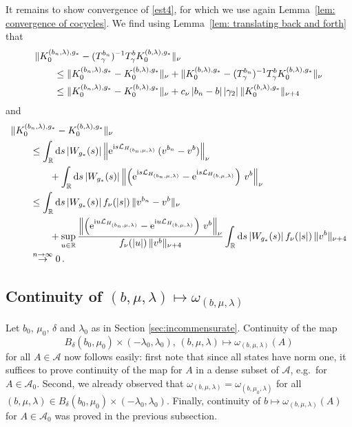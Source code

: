\documentclass[a4paper]{article}
\newcommand{\e}{\mathrm{e}}
\renewcommand{\i}{\mathrm{i}}
\newcommand{\g}{\gamma}
\newcommand{\w}{\omega}
\newcommand{\mA}{\mathcal{A}}
\newcommand{\R}{\mathbb{R}}
\newcommand{\mL}{\mathcal{L}}
\DeclarePairedDelimiter\abs{\lvert}{\rvert}
\theoremstyle{plain}
\theoremstyle{definition}
\theoremstyle{remark}
\renewcommand{\(}{\left(}
\renewcommand{\)}{\right)}
\begin{document}
It remains to show convergence of \eqref{est4}, for which we use again Lemma~\ref{lem: convergence of cocycles}. 
We find using Lemma~\ref{lem: translating back and forth} that
\begin{align*}
    \hspace{2em}&\hspace{-2em}
    \lVert    K^{(b_n,\lambda),g_*}_0 - (T_\g^{b_n})^{-1}T^{b}_\gamma K^{(b,\lambda),g_*}_0  \rVert_\nu 
    \\
    &\leq
    \lVert    K^{(b_n,\lambda),g_*}_0 - K^{(b,\lambda),g_*}_0 \rVert_\nu + \lVert    K^{(b,\lambda),g_*}_0 - (T_\g^{b_n})^{-1}T^{b}_\gamma K^{(b,\lambda),g_*}_0  \rVert_\nu
    \\
    &\leq
    \lVert    K^{(b_n,\lambda),g_*}_0 - K^{(b,\lambda),g_*}_0 \rVert_\nu + c_\nu \, |b_n-b|\,|\gamma_2|\, \| K^{(b,\lambda) ,g_*}_0\|_{\nu+4}\,    
\end{align*}
and
\begin{align*}
    \hspace{2em}&\hspace{-2em}
    \lVert    K^{(b_n,\lambda),g_*}_0 - K^{(b,\lambda),g_*}_0 \rVert_\nu
    \\
    &\leq
    \int_{\R}\mathrm{d}s \,\abs{W_{g_*}(s)}  \left\| \e^{\i s\mL_{H_{(b_n,\mu,\lambda)}}} \, (v^{b_n} - v^b) \right\|_\nu
    \\
    &\hspace{2em}+
    \int_{\R}\mathrm{d}s \,\abs{W_{g_*}(s)}  \left\| \left(\e^{\i s\mL_{H_{(b_n,\mu,\lambda)}}} -\e^{\i s\mL_{H_{(b,\mu,\lambda)}}}\right) \, v^{b} \right\|_\nu
    \\
    &\leq
    \int_{\R}\mathrm{d}s \, \abs{W_{g_*}(s)} \,f_\nu(|s|)\, \|v^{b_n}- v^b\|_{\nu}
    \\
    &\hspace{2em}+
    \sup_{u\in\R}\frac{\left\lVert  \left( \e^{\i u\mL_{H_{(b_n,\mu,\lambda)}}} -\e^{\i u\mL_{H_{(b,\mu,\lambda)}}} \right) \,v^{b} \right\rVert_\nu}{f_\nu(|u|)\,\lVert v^{b} \rVert_{\nu+4}}
    \int_{\R}\mathrm{d}s \, \abs{W_{g_*}(s)} \,f_\nu(|s|)\, \|v^{b}\|_{\nu+4}    
    \\
    &\stackrel{n\to\infty}{\rightarrow} 0\,.
\end{align*}




\subsection{Continuity of $(b,\mu,\lambda)\mapsto \w_{(b,\mu,\lambda)}$} \label{continuity_in_lambda}
Let $b_0$, $\mu_0$, $\delta$ and $\lambda_0$ as in Section \ref{sec:incommensurate}. Continuity of the map \[B_\delta(b_0,\mu_0)\times (-\lambda_0,\lambda_0),\, (b,\mu,\lambda)\mapsto \w_{(b,\mu,\lambda)}(A)\]
for all $A\in\mA$ now follows easily: first note that since all states have norm one, it suffices to prove continuity of the map for $A$ in a dense subset of $\mA$, e.g.\ for $A\in\mA_0$.
Second, we already observed that $\w_{(b,\mu,\lambda)} = \w_{(b,\mu_0,\lambda)}$
for all $(b,\mu,\lambda)\in B_\delta(b_0,\mu_0)\times (-\lambda_0,\lambda_0)$. Finally, continuity of 
$b\mapsto \w_{(b,\mu, \lambda)}(A)$ for $A\in\mA_0$ was proved in the previous subsection.
\end{document}
